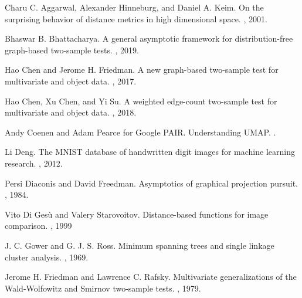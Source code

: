 \documentclass{article}
\begin{document}
\begin{thebibliography}{10}

Charu C. Aggarwal, Alexander Hinneburg, and Daniel A. Keim.
\newblock On the surprising behavior of distance metrics in high dimensional space.
, 2001.

Bhaswar B. Bhattacharya.
\newblock A general asymptotic framework for distribution-free graph-based two-sample tests.
, 2019.

Hao Chen and Jerome H. Friedman.
\newblock A new graph-based two-sample test for multivariate and object data.
, 2017.

Hao Chen, Xu Chen, and Yi Su.
\newblock A weighted edge-count two-sample test for multivariate and object data.
, 2018.

Andy Coenen and Adam Pearce for Google PAIR.
\newblock Understanding UMAP.
.

Li Deng.
\newblock The MNIST database of handwritten digit images for machine learning research.
, 2012.

Persi Diaconis and David Freedman.
\newblock Asymptotics of graphical projection pursuit.
, 1984.

Vito Di Ges\`u and Valery Starovoitov.
\newblock Distance-based functions for image comparison.
, 1999

J. C. Gower and G. J. S. Ross.
\newblock Minimum spanning trees and single linkage cluster analysis.
, 1969.

Jerome H. Friedman and Lawrence C. Rafsky.
\newblock Multivariate generalizations of the Wald-Wolfowitz and Smirnov two-sample tests.
, 1979.


\end{thebibliography}
\end{document}
